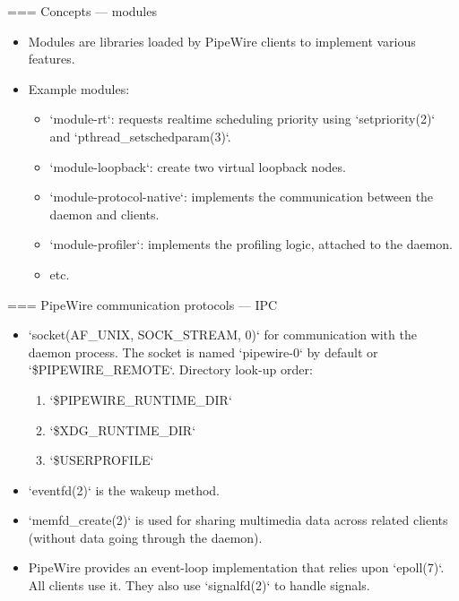 === {Concepts — modules}
  \begin{itemize}

  \item Modules are libraries loaded by PipeWire clients to implement
    various features.

  \item Example modules:

    \begin{itemize}
    \item `module-rt`: requests realtime scheduling priority using
      `setpriority(2)` and `pthread_setschedparam(3)`.
    \item `module-loopback`: create two virtual loopback nodes.
    \item `module-protocol-native`: implements the communication
      between the daemon and clients.
    \item `module-profiler`: implements the profiling logic,
      attached to the daemon.
    \item etc.
    \end{itemize}

  \end{itemize}




=== {PipeWire communication protocols — IPC}
  \begin{itemize}

  \item `socket(AF_UNIX, SOCK_STREAM, 0)` for communication with
    the daemon process. The socket is named `pipewire-0` by
    default or `\$PIPEWIRE_REMOTE`. Directory look-up order:
    \begin{enumerate}
    \item `\$PIPEWIRE_RUNTIME_DIR`
    \item `\$XDG_RUNTIME_DIR`
    \item `\$USERPROFILE`
    \end{enumerate}
  \item `eventfd(2)` is the wakeup method.
  \item `memfd_create(2)` is used for sharing multimedia data
    across related clients (without data going through the daemon).
  \item PipeWire provides an event-loop implementation that relies
    upon `epoll(7)`. All clients use it. They also use
    `signalfd(2)` to handle signals.

  \end{itemize}




